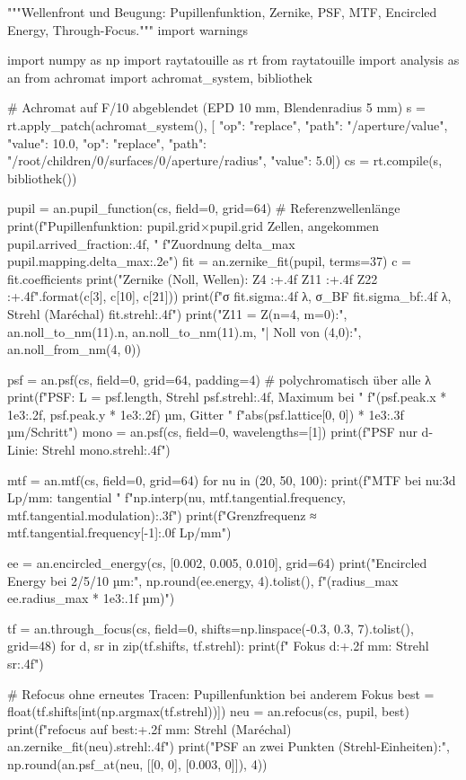 \documentclass[11pt,a4paper,openany]{book}
\DeclareRobustCommand{\code}[1]{\texttt{\directlua{rttcode("\luaescapestring{\detokenize{#1}}")}}}
\begin{document}
\begin{pycode}[title={\code{ex10_beugung.py}}]
"""Wellenfront und Beugung: Pupillenfunktion, Zernike, PSF, MTF, Encircled Energy, Through-Focus."""
import warnings

import numpy as np
import raytatouille as rt
from raytatouille import analysis as an
from achromat import achromat_system, bibliothek

# Achromat auf F/10 abgeblendet (EPD 10 mm, Blendenradius 5 mm)
s = rt.apply_patch(achromat_system(), [
    {"op": "replace", "path": "/aperture/value", "value": 10.0},
    {"op": "replace", "path": "/root/children/0/surfaces/0/aperture/radius", "value": 5.0}])
cs = rt.compile(s, bibliothek())

pupil = an.pupil_function(cs, field=0, grid=64)        # Referenzwellenlänge
print(f"Pupillenfunktion: {pupil.grid}×{pupil.grid} Zellen, angekommen {pupil.arrived_fraction:.4f}, "
      f"Zuordnung delta_max {pupil.mapping.delta_max:.2e}")
fit = an.zernike_fit(pupil, terms=37)
c = fit.coefficients
print("Zernike (Noll, Wellen): Z4 {:+.4f}  Z11 {:+.4f}  Z22 {:+.4f}".format(c[3], c[10], c[21]))
print(f"σ {fit.sigma:.4f} λ, σ_BF {fit.sigma_bf:.4f} λ, Strehl (Maréchal) {fit.strehl:.4f}")
print("Z11 = Z(n=4, m=0):", an.noll_to_nm(11).n, an.noll_to_nm(11).m, "| Noll von (4,0):",
      an.noll_from_nm(4, 0))

psf = an.psf(cs, field=0, grid=64, padding=4)          # polychromatisch über alle λ
print(f"PSF: L = {psf.length}, Strehl {psf.strehl:.4f}, Maximum bei "
      f"({psf.peak.x * 1e3:.2f}, {psf.peak.y * 1e3:.2f}) µm, Gitter "
      f"{abs(psf.lattice[0, 0]) * 1e3:.3f} µm/Schritt")
mono = an.psf(cs, field=0, wavelengths=[1])
print(f"PSF nur d-Linie: Strehl {mono.strehl:.4f}")

mtf = an.mtf(cs, field=0, grid=64)
for nu in (20, 50, 100):
    print(f"MTF bei {nu:3d} Lp/mm: tangential "
          f"{np.interp(nu, mtf.tangential.frequency, mtf.tangential.modulation):.3f}")
print(f"Grenzfrequenz ≈ {mtf.tangential.frequency[-1]:.0f} Lp/mm")

ee = an.encircled_energy(cs, [0.002, 0.005, 0.010], grid=64)
print("Encircled Energy bei 2/5/10 µm:", np.round(ee.energy, 4).tolist(),
      f"(radius_max {ee.radius_max * 1e3:.1f} µm)")

tf = an.through_focus(cs, field=0, shifts=np.linspace(-0.3, 0.3, 7).tolist(), grid=48)
for d, sr in zip(tf.shifts, tf.strehl):
    print(f"  Fokus {d:+.2f} mm: Strehl {sr:.4f}")

# Refocus ohne erneutes Tracen: Pupillenfunktion bei anderem Fokus
best = float(tf.shifts[int(np.argmax(tf.strehl))])
neu = an.refocus(cs, pupil, best)
print(f"refocus auf {best:+.2f} mm: Strehl (Maréchal) {an.zernike_fit(neu).strehl:.4f}")
print("PSF an zwei Punkten (Strehl-Einheiten):", np.round(an.psf_at(neu, [[0, 0], [0.003, 0]]), 4))
\end{pycode}
\end{document}
